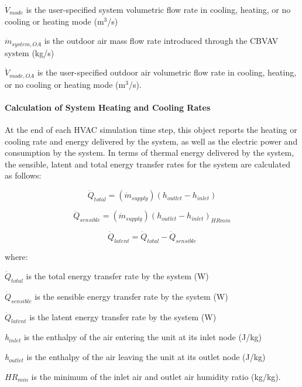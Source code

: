 \({\dot V_{mode}}\) is the user-specified system volumetric flow rate in cooling, heating, or no cooling or heating mode (m\(^{3}\)/s)

\({\dot m_{system,OA}}\) is the outdoor air mass flow rate introduced through the CBVAV system (kg/s)

\({\dot V_{mode,OA}}\) is the user-specified outdoor air volumetric flow rate in cooling, heating, or no cooling or heating mode (m\(^{3}\)/s).

\paragraph{Calculation of System Heating and Cooling Rates}\label{calculation-of-system-heating-and-cooling-rates}

At the end of each HVAC simulation time step, this object reports the heating or cooling rate and energy delivered by the system, as well as the electric power and consumption by the system. In terms of thermal energy delivered by the system, the sensible, latent and total energy transfer rates for the system are calculated as follows:

\begin{equation}
{\dot Q_{total}} = ({\dot m_{supply}})({h_{outlet}} - {h_{inlet}})
\end{equation}

\begin{equation}
{\dot Q_{sensible}} = ({\dot m_{supply}}){({h_{outlet}} - {h_{inlet}})_{HRmin}}
\end{equation}

\begin{equation}
{\dot Q_{latent}} = {\dot Q_{total}} - {\dot Q_{sensible}}
\end{equation}

where:

\(\dot{Q}_{total}\) is the total energy transfer rate by the system (W)

\(\dot{Q}_{sensible}\) is the sensible energy transfer rate by the system (W)

\(\dot{Q}_{latent}\) is the latent energy transfer rate by the system (W)

\emph{h\(_{inlet}\)} is the enthalpy of the air entering the unit at its inlet node (J/kg)

\emph{h\(_{outlet}\)} is the enthalpy of the air leaving the unit at its outlet node (J/kg)

\(H{R_{min}}\) is the minimum of the inlet air and outlet air humidity ratio (kg/kg).

